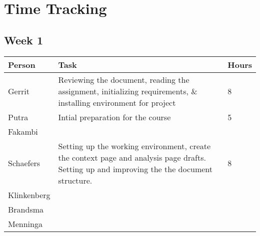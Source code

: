 \chapter{Time Tracking}
\label{App: Time Tracking}

\section{Week 1}
\begin{tabular}{L{} L{} L{}}
    \textbf{Person} & \textbf{Task} & \textbf{Hours} \\ \midrule
	Gerrit & Reviewing the document, reading the assignment, initializing requirements, \& installing environment for project & 8 \\ \midrule
	Putra & Intial preparation for the course & 5 \\ \midrule
	Fakambi & & \\ \midrule
	Schaefers & Setting up the working environment, create the context page and analysis page drafts. Setting up and improving the the document structure. & 8\\ \midrule
	Klinkenberg & & \\ \midrule
	Brandsma & & \\ \midrule
	Menninga & & \\ \bottomrule
\end{tabular}